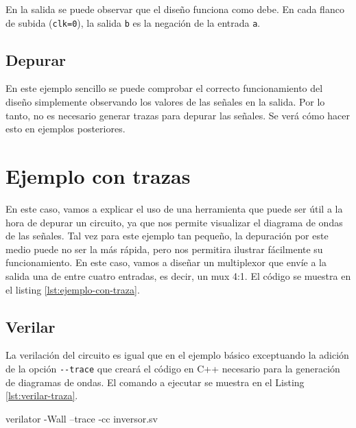 

En la salida se puede observar que el diseño funciona como debe. En cada flanco de subida (\verb|clk=0|), la salida \verb|b| es la negación de la entrada \verb|a|.

\subsection{Depurar}
En este ejemplo sencillo se puede comprobar el correcto funcionamiento del diseño simplemente observando los valores de las señales en la salida. Por lo tanto, no es necesario generar trazas para depurar las señales. Se verá cómo hacer esto en ejemplos posteriores.


\section{Ejemplo con trazas}
En este caso, vamos a explicar el uso de una herramienta que puede ser útil a la hora de depurar un circuito, ya que nos permite visualizar el diagrama de ondas de las señales. Tal vez para este ejemplo tan pequeño, la depuración por este medio puede no ser la más rápida, pero nos permitira ilustrar fácilmente su funcionamiento. En este caso, vamos a diseñar un multiplexor que envíe a la salida una de entre cuatro entradas, es decir, un mux 4:1. El código se muestra en el listing \ref{lst:ejemplo-con-traza}.



\subsection{Verilar}
La verilación del circuito es igual que en el ejemplo básico exceptuando la adición de la opción \verb|--trace| que creará el código en C++ necesario para la generación de diagramas de ondas. El comando a ejecutar se muestra en el Listing \ref{lst:verilar-traza}.

\begin{mycode}[style=bashstyle, label=lst:verilar-traza, caption={Instrucción para verilar el diseño habilitando las trazas.}]
verilator -Wall --trace -cc inversor.sv
\end{mycode}

